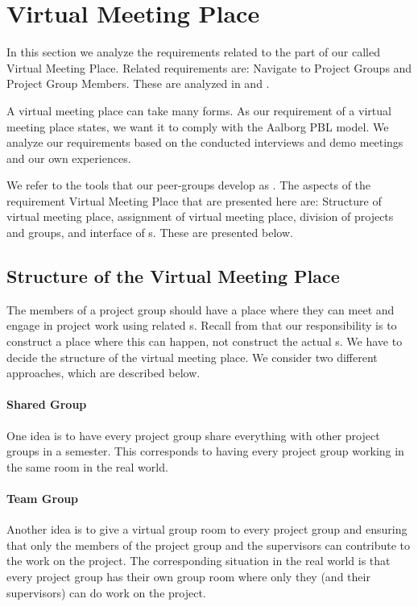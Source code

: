 \section{Virtual Meeting Place}
\label{sec:virtualMeetingPlace}
\label{sec:projectgroup}
In this section we analyze the requirements related to the part of our \subsystem{} called Virtual Meeting Place.
Related requirements are: Navigate to Project Groups and Project Group Members.
These are analyzed in  and .

A virtual meeting place can take many forms.
As our requirement of a virtual meeting place states, we want it to comply with the Aalborg PBL model.
We analyze our requirements based on the conducted interviews and demo meetings and our own experiences.

We refer to the tools that our peer-groups develop as \detdeandrelaver{}.
The aspects of the requirement Virtual Meeting Place that are presented here are: Structure of virtual meeting place, assignment of virtual meeting place, division of projects and groups, and interface of \detdeandrelaver[]s.
These are presented below.


\subsection{Structure of the Virtual Meeting Place}
The members of a project group should have a place where they can meet and engage in project work using related \detdeandrelaver[]s.
Recall from  that our responsibility is to construct a place where this can happen, not construct the actual \detdeandrelaver[]s.
We have to decide the structure of the virtual meeting place.
We consider two different approaches, which are described below.


\paragraph{Shared Group} One idea is to have every project group share everything with other project groups in a semester.
This corresponds to having every project group working in the same room in the real world.

\paragraph{Team Group} Another idea is to give a virtual group room to every project group and ensuring that only the members of the project group and the supervisors can contribute to the work on the project.
The corresponding situation in the real world is that every project group has their own group room where only they (and their supervisors) can do work on the project. \\

